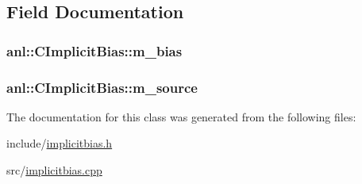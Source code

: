 \subsection{Field Documentation}
\hypertarget{classanl_1_1CImplicitBias_a9a11ff710d4551a7f58cc031390d0af5}{
\subsubsection[{m\_\-bias}]{ {\bf anl::CImplicitBias::m\_\-bias}}}
\label{classanl_1_1CImplicitBias_a9a11ff710d4551a7f58cc031390d0af5}
\hypertarget{classanl_1_1CImplicitBias_a217301e5e28be9ff0918f54d3d8fa011}{
\subsubsection[{m\_\-source}]{ {\bf anl::CImplicitBias::m\_\-source}}}
\label{classanl_1_1CImplicitBias_a217301e5e28be9ff0918f54d3d8fa011}


The documentation for this class was generated from the following files:\begin{DoxyCompactItemize}
\item 
include/\hyperlink{implicitbias_8h}{implicitbias.h}\item 
src/\hyperlink{implicitbias_8cpp}{implicitbias.cpp}\end{DoxyCompactItemize}
